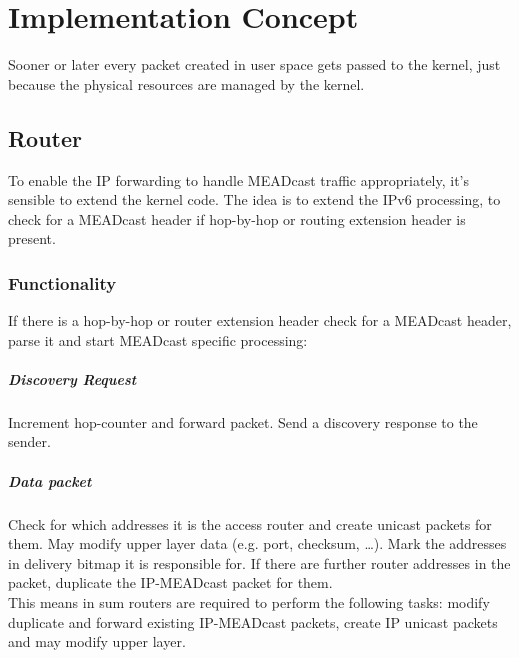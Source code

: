 \chapter{Implementation Concept}
Sooner or later every packet created in user space gets passed to the kernel,
just because the physical resources are managed by the kernel. 

\section{Router}
To enable the IP forwarding to handle MEADcast traffic appropriately, it's
sensible to extend the kernel code.
The idea is to extend the IPv6 processing, to check for a MEADcast header if
hop-by-hop or routing extension header is present.

\subsection{Functionality} %
\label{sub:Functionality}
If there is a hop-by-hop or router extension header check for a MEADcast header,
parse it and start MEADcast specific processing:

\paragraph{Discovery Request} %
\label{par:Discovery Request}
Increment hop-counter and forward packet.
Send a discovery response to the sender.

\paragraph{Data packet} %
\label{par:Data packet}
Check for which addresses it is the access router and create unicast packets for
them.
May modify upper layer data (e.g. port, checksum, \dots).
Mark the addresses in delivery bitmap it is responsible for.
If there are further router addresses in the packet, duplicate the IP-MEADcast
packet for them.
\\

This means in sum routers are required to perform the following tasks: modify 
duplicate and forward existing IP-MEADcast packets, create IP unicast packets
and may modify upper layer.


